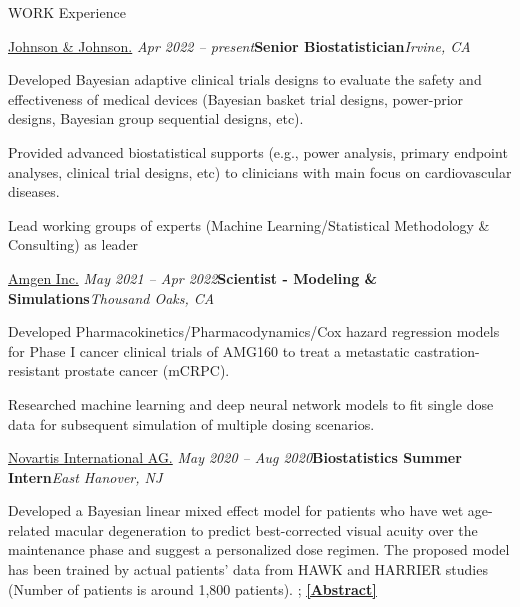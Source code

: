 \documentclass{resume} %
\begin{document}

\begin{rSection}{WORK Experience}


\begin{rSubsection}{
\href{https://www.jnjmedtech.com/en-US}{Johnson \& Johnson.}
}{\em Apr 2022 -- present}{\textbf{Senior Biostatistician}}{\em Irvine, CA}
\item Developed Bayesian adaptive clinical trials designs to evaluate the safety and effectiveness of medical devices (Bayesian basket trial designs, power-prior designs, Bayesian group sequential designs, etc).
\item Provided advanced biostatistical supports (e.g., power analysis, primary endpoint analyses, clinical trial designs, etc) to clinicians with main focus on cardiovascular diseases.
\item Lead working groups of experts (Machine Learning/Statistical Methodology \& Consulting) as leader
\end{rSubsection}


\begin{rSubsection}{
\href{https://www.amgen.com/}{Amgen Inc.}
}{\em May 2021 -- Apr 2022}{\textbf{Scientist - Modeling \& Simulations}}{\em Thousand Oaks, CA}
\item 
Developed Pharmacokinetics/Pharmacodynamics/Cox hazard regression models for Phase I cancer clinical trials of AMG160 to treat a metastatic castration-resistant prostate cancer (mCRPC).
\item 
Researched machine learning and deep neural network models to fit single dose data for subsequent simulation of multiple dosing scenarios. 
\end{rSubsection}

\newpage
\begin{rSubsection}{
\href{https://www.pharma.us.novartis.com/}{Novartis International AG.}
}{\em May 2020 -- Aug 2020}{\textbf{Biostatistics Summer Intern}}{\em East Hanover, NJ}
\item 
Developed a Bayesian linear mixed effect model for patients who have wet age-related macular degeneration to predict best-corrected visual acuity over the maintenance phase and suggest a personalized dose regimen. The proposed model has been trained by actual patients' data from HAWK and HARRIER studies (Number of patients is around 1,800 patients). ; \href{https://sites.google.com/view/seyoonlee/home/projects/novartis-summer-internship-project?authuser=0#h.dfc3zhswkx8m}
{\underline{\textbf{[Abstract]}}}
\end{rSubsection}


\end{rSection}
\end{document}
